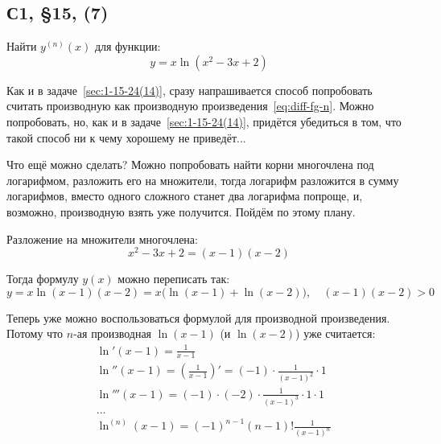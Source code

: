 \documentclass[a4paper,12pt]{article}
\begin{document}
  
  \subsection{С1, \S 15, (7)}

  Найти $y^{(n)}(x)$ для функции:
  \[
    y = x \ln{(x^2 - 3x + 2)}
  \]
  
  \begin{solution}
    Как и в задаче~\ref{sec:1-15-24(14)}, сразу напрашивается способ попробовать считать производную как производную произведения~\eqref{eq:diff-fg-n}.
    Можно попробовать, но, как и в задаче~\ref{sec:1-15-24(14)}, придётся убедиться в том, что такой способ ни к чему хорошему не приведёт...

    Что ещё можно сделать?
    Можно попробовать найти корни многочлена под логарифмом, разложить его на множители, тогда логарифм разложится в сумму логарифмов, вместо одного сложного станет два логарифма попроще, и, возможно, производную взять уже получится.
    Пойдём по этому плану.

    Разложение на множители многочлена:
    \[
      x^2 - 3x + 2 = (x - 1) (x - 2)
    \]

    Тогда формулу $y(x)$ можно переписать так:%
    \[
      y = x \ln{(x - 1)(x - 2)}
        = x \bigl(\ln{(x - 1)} + \ln{(x - 2)}\bigr),\quad (x - 1)(x - 2) > 0
    \]

    Теперь уже можно воспользоваться формулой для производной произведения.
    Потому что $n$-ая производная $\ln{(x - 1)}$ (и $\ln{(x - 2)}$) уже считается:
    \[
      \begin{aligned}
        &\ln'{(x - 1)} = \frac{1}{x - 1}\\
        &\ln''{(x - 1)} = \left(\frac{1}{x - 1}\right)' = (-1) \cdot \frac{1}{(x - 1)^2} \cdot 1\\
        &\ln'''{(x - 1)} = (-1) \cdot (-2) \cdot \frac{1}{(x - 1)^3} \cdot 1 \cdot 1\\
        &\ldots\\
        &\ln^{(n)}{(x - 1)} = (-1)^{n - 1} (n - 1)! \frac{1}{(x - 1)^n}
      \end{aligned}
    \]


\end{solution}
\end{document}
